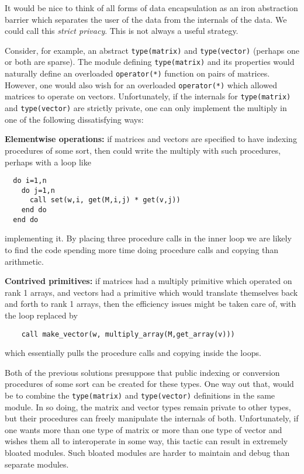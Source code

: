 It would be nice to think of all forms of data encapsulation 
as an iron abstraction barrier which separates the user of the data from
the internals of the data.  We could call this {\em strict privacy}.
This is not always a useful strategy.

Consider, for example, an abstract \verb+type(matrix)+ and
\verb+type(vector)+ (perhaps one or both are sparse).
The module defining \verb+type(matrix)+
and its properties would naturally define an overloaded
\verb+operator(*)+ function on pairs of matrices.  However,
one would also wish for an overloaded \verb+operator(*)+ which allowed
matrices to operate on vectors.  Unfortunately, if the internals for
\verb+type(matrix)+ and \verb+type(vector)+ are strictly private,
one can only implement the multiply in one of the following dissatisfying
ways:

{\bf Elementwise operations:}  if matrices and vectors are specified to
have indexing procedures of some sort, then could write the multiply
with such procedures, perhaps with a loop like
\begin{verbatim}
  do i=1,n
    do j=1,n
      call set(w,i, get(M,i,j) * get(v,j))
    end do
  end do
\end{verbatim}
implementing it.  By placing three procedure calls in the inner loop we
are likely to find the code spending more time doing procedure calls
and copying than arithmetic.

{\bf Contrived primitives:} if matrices had a multiply primitive which
operated on rank 1 arrays, and vectors had a primitive which would translate
themselves back and forth to rank 1 arrays, then the efficiency issues
might be taken care of, with the loop replaced by
\begin{verbatim}
    call make_vector(w, multiply_array(M,get_array(v)))
\end{verbatim}
which essentially pulls the procedure calls and copying inside the loops.

Both of the previous solutions presuppose that public indexing or
conversion procedures of some sort can be created for these types.
One way out that, would be to combine the \verb+type(matrix)+ and
\verb+type(vector)+ definitions in the same module.  In so doing, the
matrix and vector types remain private to other types, but their
procedures can freely manipulate the internals of both.
Unfortunately, if one wants more than one type of matrix or more than
one type of vector and wishes them all to interoperate in some way,
this tactic can result in extremely bloated modules.  Such bloated
modules are harder to maintain and debug than separate modules.

